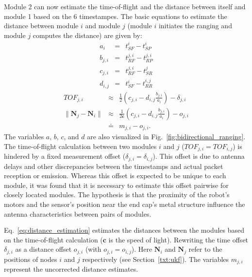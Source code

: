 Module 2 can now estimate the time-of-flight and the distance between itself and module 1 based on the 6 timestampes.
The basic equations to estimate the distance between module $i$ and module $j$ (module $i$ initiates the ranging and module $j$ computes the distance) are given by:
\begin{eqnarray} %
a_{i} &=& t_{SF}^i-t_{SP}^i\\
b_{j,i} &=& t_{RF}^{j,i}-t_{RP}^{j,i}\\ %
c_{j,i} &=& t_{RF}^{j,i}-t_{SR}^j\\  
d_{i,j} &=& t_{SF}^i-t_{RR}^{i,j} %
\end{eqnarray}
\begin{eqnarray}
{TOF}_{j,i}  &\approx& \frac{1}{2}\left(c_{j,i}-d_{i,j}\frac{b_{j,i}}{a_i} \right)-\delta_{j,i}\\
\|\bm{N}_j - \bm{N}_i\| &\approx& \frac{1}{2\bm{c}}\left(c_{j,i}-d_{i,j}\frac{b_{j,i}}{a_i} \right)-o_{j,i} \label{eq:distance_estimation}\\
&\doteq& m_{j,i}-o_{j,i} .
\end{eqnarray}
The variables $a$, $b$, $c$, and $d$ are also visualized in Fig.~\ref{fig:bidirectional_ranging}.
The time-of-flight calculation between two modules $i$ and $j$ ($TOF_{j,i}=TOF_{i,j}$) is hindered by a fixed measurement offset ($\delta_{j,i}=\delta_{i,j}$).
This offset is due to antenna delays and other discrepancies  between the timestamps and actual packet reception or emission.
Whereas this offset is expected to be unique to each module, it was found that it is necessary to estimate this offset pairwise for closely located modules.
The hypothesis is that the proximity of the robot's motors and the sensor's position near the end cap's metal structure influence the antenna characteristics between pairs of modules.

Eq.~\ref{eq:distance_estimation} estimates the distances between the modules based on the time-of-flight calculation ($\bm{c}$ is the speed of light).
Rewriting the time offset $\delta_{j,i}$ as a distance offset $o_{j,i}$ (with $o_{j,i}=o_{i,j}$).
Here $\bm{N}_i$ and $\bm{N}_j$ refer to the positions of nodes $i$ and $j$ respectively (see Section~\ref{txt:ukf}).
The variables $m_{j,i}$ represent the uncorrected distance estimates.



